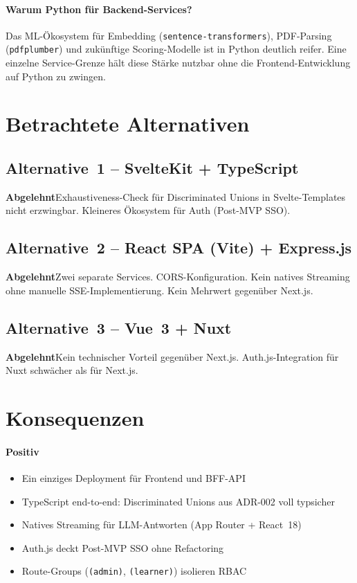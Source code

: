 \documentclass[a4paper, 11pt, oneside]{report}
\newcommand{\code}[1]{\texttt{\small #1}}
\newcommand{\abgelehnt}{\colorbox{depbg}{\small\bfseries\color{warnframe}Abgelehnt}\;}
\begin{document}
\paragraph{Warum Python für Backend-Services?}
Das ML-Ökosystem für Embedding (\code{sentence-transformers}), PDF-Parsing
(\code{pdfplumber}) und zukünftige Scoring-Modelle ist in Python deutlich
reifer. Eine einzelne Service-Grenze hält diese Stärke nutzbar ohne die
Frontend-Entwicklung auf Python zu zwingen.

\section{Betrachtete Alternativen}

\subsection{Alternative~1 -- SvelteKit + TypeScript}

\abgelehnt Exhaustiveness-Check für Discriminated Unions in Svelte-Templates
nicht erzwingbar. Kleineres Ökosystem für Auth (Post-MVP SSO).

\subsection{Alternative~2 -- React SPA (Vite) + Express.js}

\abgelehnt Zwei separate Services. CORS-Konfiguration. Kein natives Streaming
ohne manuelle SSE-Implementierung. Kein Mehrwert gegenüber Next.js.

\subsection{Alternative~3 -- Vue~3 + Nuxt}

\abgelehnt Kein technischer Vorteil gegenüber Next.js. Auth.js-Integration
für Nuxt schwächer als für Next.js.

\section{Konsequenzen}

\paragraph{Positiv}
\begin{itemize}
  \item Ein einziges Deployment für Frontend und BFF-API
  \item TypeScript end-to-end: Discriminated Unions aus ADR-002 voll typsicher
  \item Natives Streaming für LLM-Antworten (App Router + React~18)
  \item Auth.js deckt Post-MVP SSO ohne Refactoring
  \item Route-Groups (\code{(admin)}, \code{(learner)}) isolieren RBAC
\end{itemize}
\end{document}
